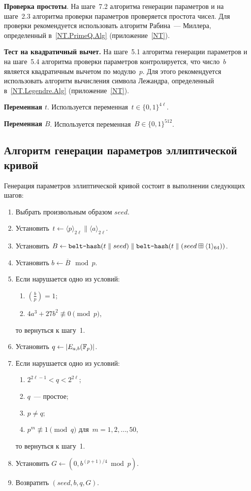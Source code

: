{\bf Проверка простоты}.
На шаге~7.2 алгоритма генерации параметров и на шаге~2.3
алгоритма проверки параметров проверяется простота чисел.
%
Для проверки рекомендуется использовать алгоритм 
Рабина~--- Миллера, определенный в~\ref{NT.PrimeQ.Alg}
(приложение~\ref{NT}).

{\bf Тест на квадратичный вычет.}
На шаге~5.1 алгоритма генерации параметров и на шаге~5.4
алгоритма проверки параметров контролируется, 
что число~$b$ является квадратичным вычетом
по модулю~$p$.
%
Для этого рекомендуется
использовать алгоритм вычисления символа Лежандра,
определенный в~\ref{NT.Legendre.Alg}
(приложение~\ref{NT}).

{\bf Переменная $t$}.
Используется переменная~$t\in\{0,1\}^{4\ell}$.

{\bf Переменная $B$}.
Используется переменная~$B\in\{0,1\}^{512}$.

\subsection{Алгоритм генерации параметров эллиптической кривой}\label{GENEC}

Генерация параметров эллиптической кривой состоит в выполнении 
следующих шагов:
\begin{enumerate}
\item
Выбрать произвольным образом $seed$.

\item
Установить~$t\leftarrow \langle p\rangle_{2\ell}\parallel \langle a\rangle_{2\ell}$.

\item
Установить
$B\leftarrow 
\texttt{belt-hash}(t\parallel seed)
\parallel
\texttt{belt-hash}(t\parallel 
(seed\boxplus\langle 1\rangle_{64}))$.

\item
Установить $b\leftarrow \overline{B}\mod p$.

\item
Если нарушается одно из условий:
\begin{enumerate}
\item
$\left(\frac{b}{p}\right)=1$;
\item
$4a^3+27b^2\not\equiv 0\pmod{p}$,
\end{enumerate}
то вернуться к шагу~1.

\item
Установить $q\leftarrow |E_{a,b}(\mathbb{F}_p)|$.

\item
Если нарушается одно из условий:
\begin{enumerate}
\item
$2^{2\ell-1}<q<2^{2\ell}$;
\item
$q$~--- простое;
\item
$p\neq q$;
\item
$p^m\not\equiv 1\pmod{q}$ для~$m=1,2,\ldots,50$,
\end{enumerate}
то вернуться к шагу~1.

\item
Установить $G\leftarrow (0,b^{(p+1)/4}\bmod p)$.

\item
Возвратить $(seed,b,q,G)$.
\end{enumerate}

